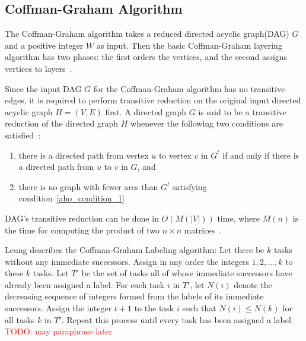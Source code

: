 \documentclass[letterpaper,12pt]{article}
\theoremstyle{definition}
\begin{document}
\subsection{Coffman-Graham Algorithm}
The Coffman-Graham algorithm takes a reduced directed acyclic graph(DAG) $G$ and a positive integer $W$ as input. Then the basic Coffman-Graham layering algorithm has two phases: the first orders the vertices, and the second assigns vertices to layers~\cite{battista_chapter_1998}.

Since the input DAG $G$ for the Coffman-Graham algorithm has no transitive edges, it is required to perform transitive reduction on the original input directed acyclic graph $H=(V,E)$ first. A directed graph $G$ is said to be a transitive reduction of the directed graph $H$ whenever the following two conditions are satisfied~\cite{aho_transitive_1972}: 
\begin{enumerate}
    \item there is a directed path from vertex $u$ to vertex $v$ in $G^t$ if and only if there is a directed path from $u$ to $v$ in $G$, and \label{aho_condition_1}
    \item there is no graph with fewer arcs than $G^t$ satisfying condition~\ref{aho_condition_1}
\end{enumerate}
DAG's transitive reduction can be done in $O(M(|V|))$ time, where $M(n)$ is the time for computing the product of two $n \times n$ matrices~\cite{ aho_transitive_1972,tamassia_handbook_2007}.

Leung\cite{leung_basic_2004} describes the Coffman-Graham Labeling algorithm: Let there be $k$ tasks without any immediate successors. Assign in any order the integers $1,2,\dots, k$ to these $k$ tasks. Let $T'$ be the set of tasks all of whose immediate successors have already been assigned a label. For each task $i$ in $T'$, let $N(i)$ denote the decreasing sequence of integers formed from the labels of its immediate successors. Assign the integer $t+1$ to the task $i$ such that $N(i)\leq N(k)$ for all tasks $k$ in $T'$. Repeat this process until every task has been assigned a label. \textcolor{red}{TODO: may paraphrase later}
\end{document}
